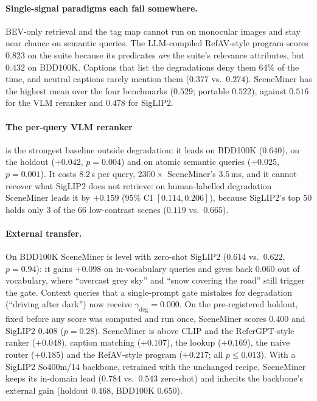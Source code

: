 \documentclass[10pt,twocolumn,letterpaper]{article}
\newcommand{\gdeg}{\gamma_{\mathrm{deg}}}
\begin{document}
\paragraph{Single-signal paradigms each fail somewhere.} BEV-only retrieval and the
tag map cannot run on monocular images and stay near chance on semantic queries. The
LLM-compiled RefAV-style program scores $0.823$ on the suite because its predicates
\emph{are} the suite's relevance attributes, but $0.432$ on BDD100K. Captions that
list the degradations deny them $64\%$ of the time, and neutral captions rarely
mention them ($0.377$ vs.\ $0.274$). SceneMiner has the highest mean over the four
benchmarks ($0.529$; portable $0.522$), against $0.516$ for the VLM reranker and
$0.478$ for SigLIP2.

\paragraph{The per-query VLM reranker} is the strongest baseline outside degradation:
it leads on BDD100K ($0.640$), on the holdout ($+0.042$, $p=0.004$) and on atomic
semantic queries ($+0.025$, $p=0.001$). It costs $8.2$\,s per query, $2300\times$
SceneMiner's $3.5$\,ms, and it cannot recover what SigLIP2 does not retrieve: on
human-labelled degradation SceneMiner leads it by $+0.159$ (95\% CI
$[0.114,0.206]$), because SigLIP2's top $50$ holds only $3$ of the $66$ low-contrast
scenes ($0.119$ vs.\ $0.665$).

\paragraph{External transfer.} On BDD100K SceneMiner is level with zero-shot
SigLIP2 ($0.614$ vs.\ $0.622$, $p=0.94$): it gains $+0.098$ on in-vocabulary
queries and gives back $0.060$ out of vocabulary, where ``overcast grey sky'' and
``snow covering the road'' still trigger the gate. Context queries that a
single-prompt gate mistakes for degradation (``driving after dark'') now receive
$\gdeg=0.000$. On the pre-registered holdout, fixed before any score was computed and
run once, SceneMiner scores $0.400$ and SigLIP2 $0.408$ ($p=0.28$). SceneMiner is
above CLIP and the ReferGPT-style ranker ($+0.048$), caption matching ($+0.107$), the
lookup ($+0.169$), the naive router ($+0.185$) and the RefAV-style program ($+0.217$;
all $p\le0.013$). With a SigLIP2 So400m/14 backbone, retrained with the unchanged
recipe, SceneMiner keeps its in-domain lead ($0.784$ vs.\ $0.543$ zero-shot) and
inherits the backbone's external gain (holdout $0.468$, BDD100K $0.650$).
\end{document}
